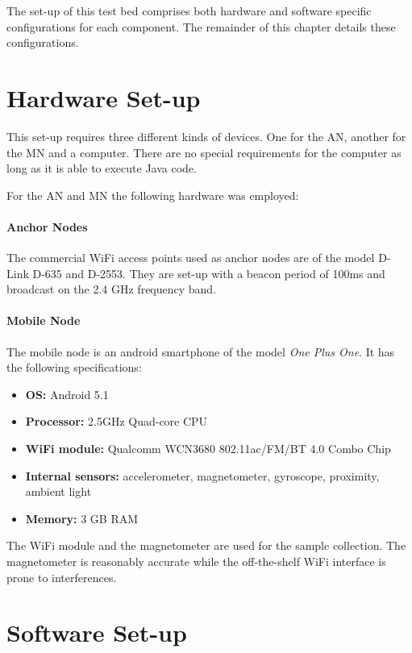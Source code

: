 The set-up of this test bed comprises both hardware and software specific configurations for each component. The remainder of this chapter details these configurations.

\section{Hardware Set-up}

This set-up requires three different kinds of devices. One for the AN, another for the MN and a computer. There are no special requirements for the computer as long as it is able to execute Java code.

For the AN and MN the following hardware was employed:

\paragraph{Anchor Nodes}
The commercial WiFi access points used as anchor nodes are of the model D-Link D-635 and D-2553. They are set-up with a beacon period of 100ms and broadcast on the 2.4 GHz frequency band.

\paragraph{Mobile Node}

The mobile node is an android smartphone of the model \emph{One Plus One}. It has the following specifications:

\begin{itemize}
\item \textbf{OS:} Android 5.1
\item \textbf{Processor:} 2.5GHz Quad-core CPU
\item \textbf{WiFi module:} Qualcomm WCN3680 802.11ac/FM/BT 4.0 Combo Chip 
\item \textbf{Internal sensors:} accelerometer, magnetometer, gyroscope, proximity, ambient light
\item \textbf{Memory:} 3 GB RAM
\end{itemize}

The WiFi module and the magnetometer are used for the sample collection. The magnetometer is reasonably accurate while the off-the-shelf WiFi interface is  prone to interferences.


\section{Software Set-up}

